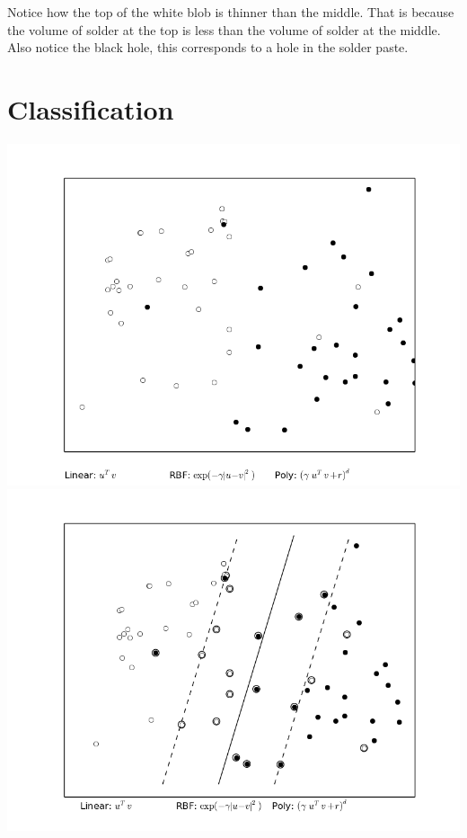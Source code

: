 \documentclass[12pt]{article}
\begin{document}
Notice how the top of the white blob is thinner than the middle.  That is because the volume of solder at the top is less than the volume of solder at the middle. Also notice the black hole, this corresponds to a hole in the solder paste.

\section{Classification}
\includegraphics{images/Classification/data.png}
\includegraphics{images/Classification/analized_data.png}


\end{document}

